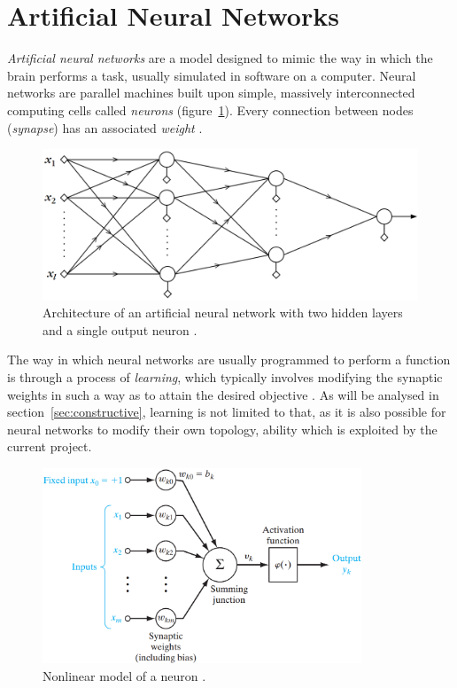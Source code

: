 \documentclass[11pt,a4paper]{report}
\begin{document}
		\section{Artificial Neural Networks}
			\emph{Artificial neural networks} are a model designed to mimic the way in which the brain performs a task, usually simulated in software on a computer. Neural networks are parallel machines built upon simple, massively interconnected computing cells called \emph{neurons} (figure~\ref{fig:multilayer}). Every connection between nodes (\emph{synapse}) has an associated \emph{weight} \cite{haykin2009neural}.
		
			\begin{figure}[h]
				\centering
				\includegraphics[width=\textwidth]{multilayer}
				\caption{Architecture of an artificial neural network with two hidden layers and a single output neuron \cite{theodoridis2008pattern}.}
				\label{fig:multilayer}
			\end{figure}		
		
			The way in which neural networks are usually programmed to perform a function is through a process of \emph{learning}, which typically involves modifying the synaptic weights in such a way as to attain the desired objective \cite{haykin2009neural}. As will be analysed in section~\ref{sec:constructive}, learning is not limited to that, as it is also possible for neural networks to modify their own topology, ability which is exploited by the current project.
		
			\newpage
		
			\begin{figure}[t]
				\centering
				\includegraphics[width=0.85\textwidth]{neuron}
				\caption{Nonlinear model of a neuron \cite{haykin2009neural}.}
				\label{fig:neuron}
			\end{figure}
		
\end{document}

